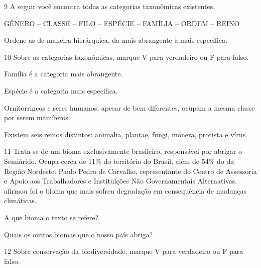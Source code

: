 \num{9}  A seguir você encontra todas as categorias taxonômicas existentes.

\begin{myquote}
GÊNERO -- CLASSE -- FILO -- ESPÉCIE -- FAMÍLIA -- ORDEM -- REINO
\end{myquote}

Ordene-as de maneira hierárquica, da mais abrangente à mais específica.



\num{10}  Sobre as categorias taxonômicas, marque V para verdadeiro ou F para falso.

\begin{boxlist}
 Família é a categoria mais abrangente.

 Espécie é a categoria mais específica.

 Ornitorrincos e seres humanos, apesar de bem diferentes, ocupam a
mesma classe por serem mamíferos.

 Existem seis reinos distintos: animalia, plantae, fungi, monera,
protista e vírus.
\end{boxlist}

\num{11} Trata-se de um bioma exclusivamente brasileiro, responsável por abrigar o Semiárido. 
  Ocupa cerca de 11\% do território do Brasil, além de 54\% do da Região
  Nordeste. Paulo
  Pedro de Carvalho, representante do Centro de Assessoria e Apoio aos
  Trabalhadores e Instituições Não Governamentais Alternativas, afirmou foi o bioma que mais sofreu
  degradação em consequência de mudanças climáticas.


\begin{escolha}
\item A que bioma o texto se refere?



\item Quais os outros biomas que o nosso país abriga?


\end{escolha}

\num{12}  Sobre conservação da biodiversidade, marque V para verdadeiro ou F para falso.

